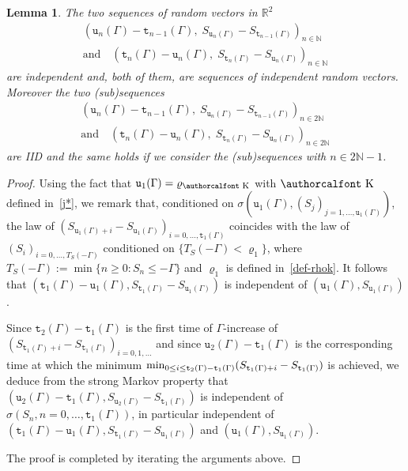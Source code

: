 \documentclass[10pt]{amsart}
\newtheorem{lemm}[theo]{Lemma}\newtheorem{prop}[theo]{Proposition}\newtheorem{coro}[theo]{Corollary}\newtheorem{conj}[theo]{Conjecture}
\theoremstyle{definition}\newtheorem{defi}[theo]{Definition}\newtheorem{rema}[theo]{Remark}\newtheorem{exam}[theo]{Example}\newtheorem{exem}[theo]{Example}\newtheorem{nota}[theo]{Notation}
\renewcommand{\mathcal}[1]{\text{\authorcalfont #1}}
\newcommand{\bbN}{\mathbb{N}}
\newcommand{\bbR}{\mathbb{R}}
\renewcommand*\ss{\mathtt{u}}
\newcommand{\ttt}{\mathtt{t}}
\newcommand{\clK}{\mathcal{K}}
\begin{document}
\begin{lemm}\label{th:ren-u}
The two sequences of random vectors in $\bbR^2$
\begin{multline}
\left(\ss_n(\Gamma)- \ttt_{n-1}(\Gamma), \;S_{\ss_n(\Gamma)}- S_{\ttt_{n-1}(\Gamma)}\right)_{n\in \bbN}\\
\text{and}\quad
\left(\ttt_n(\Gamma)- \ss_n(\Gamma), \;S_{\ttt_n(\Gamma)}- S_{\ss_n(\Gamma)}\right)_{n\in \bbN}
\end{multline}
are independent and, both of them, are sequences of independent random vectors. Moreover the two (sub)sequences
\begin{multline}
\left(\ss_n(\Gamma)- \ttt_{n-1}(\Gamma), \;S_{\ss_n(\Gamma)}- S_{\ttt_{n-1}(\Gamma)}\right)_{n\in 2\bbN}\\
\text{and}\quad
\left(\ttt_n(\Gamma)- \ss_n(\Gamma), \;S_{\ttt_n(\Gamma)}- S_{\ss_n(\Gamma)}\right)_{n\in 2\bbN}
\end{multline}
are IID and the same holds if we consider the (sub)sequences with $n \in 2\bbN-1$.
\end{lemm}

\begin{proof}
Using the fact that $\ss_1(\Gamma)=\varrho_{\clK}$ with ${\clK}$ defined in~\eqref{j*}, we remark that, conditioned on $\sigma(\ss_1(\Gamma), (S_j)_{j=1,
\dots,\ss_1(\Gamma)})$, the law of $(S_{\ss_1(\Gamma)+i}-S_{\ss_1(\Gamma)})_{i=0, \dots, \ttt_1(\Gamma)}$ coincides with the law of $(S_i)_{i=0, \dots, T_S(-\Gamma)}$ conditioned on $\{T_S(-\Gamma)< \varrho_1\}$, where $T_S(-\Gamma):= \min\{n\ge 0: S_n \le -\Gamma\}$ and $\varrho_1$ is defined in~\eqref{def-rhok}. It follows that $(\ttt_1(\Gamma)-\ss_1(\Gamma), S_{\ttt_1(\Gamma)}- S_{\ss_1(\Gamma)})$ is independent of $(\ss_1(\Gamma), S_{\ss_1(\Gamma)})$.

Since $\ttt_2(\Gamma)-\ttt_1(\Gamma)$ is the first time of $\Gamma$-increase of $(S_{\ttt_1(\Gamma)+i}- S_{\ttt_1(\Gamma)})_{i=0, 1, \dots}$ and since $\ss_2(\Gamma)-\ttt_1(\Gamma)$ is the corresponding time at which the minimum $\min_{0\le i \le \ttt_2(\Gamma)-\ttt_1(\Gamma)}\linebreak(S_{\ttt_1(\Gamma)+i}- S_{\ttt_1(\Gamma)})$ is achieved, we deduce from the strong Markov property that $(\ss_2(\Gamma)-\ttt_1(\Gamma), S_{\ss_2(\Gamma)}- S_{\ttt_1(\Gamma)})$ is independent of $\sigma(S_n, n=0, \dots, \ttt_1(\Gamma))$, in particular independent of $(\ttt_1(\Gamma)-\ss_1(\Gamma), S_{\ttt_1(\Gamma)}- S_{\ss_1(\Gamma)})$ and $(\ss_1(\Gamma), S_{\ss_1(\Gamma)})$.

The proof is completed by iterating the arguments above.
\end{proof}
\end{document}
